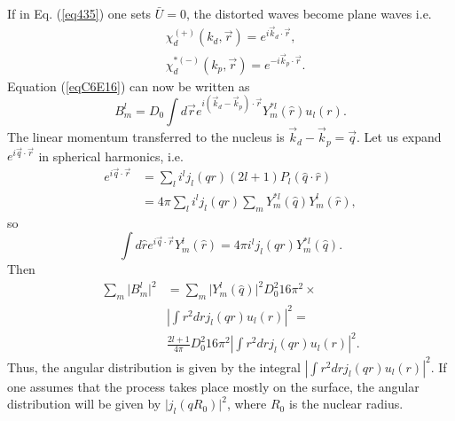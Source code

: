 \begin{subappendices}
If in Eq. (\ref{eq435}) one sets $\bar U=0$, the distorted waves become plane waves i.e.
 \begin{subequations}
\begin{align}\label{eq437}
&\chi^{(+)}_d(k_d,\vec r)=e^{i \vec k_d \cdot \vec r},\\
&\chi^{*(-)}_d(k_p,\vec r)=e^{-i \vec k_p \cdot \vec r}.
\end{align}
\end{subequations}
Equation (\ref{eqC6E16}) can now be written as
\begin{equation}\label{eq438}
B_{m}^l=D_0 \int d\vec r e^{i (\vec k_d-\vec k_p) \cdot \vec r} Y_m^{*l}(\hat r) u_{l}(r).
\end{equation}
The linear momentum transferred to the nucleus is $\vec k_d-\vec k_p=\vec q$.
Let us expand $e^{i \vec q \cdot \vec r}$ in spherical harmonics, i.e.
\begin{equation}\label{eq439}
\begin{split}
 e^{i \vec q \cdot \vec r}&=\sum_l i^l j_l(qr)(2l+1)P_l(\hat q \cdot \hat r)\\
& =4 \pi \sum_l i^l j_l(qr)\sum_m Y_m^{*l}(\hat q) Y_m^{l}(\hat r),
\end{split}
\end{equation}
so
\begin{equation}\label{eq440}
 \int d\hat r e^{i \vec q \cdot \vec r} Y_m^{l}(\hat r)= 4 \pi i^l j_l(qr) Y_m^{*l}(\hat q).
\end{equation}
Then
\begin{equation}\label{eq441}
\begin{split}
 \sum_{m} \vert B_{m}^l\vert^2 & = \sum_{m} \vert Y_m^{l}(\hat q)\vert^2 D_0^2 16 \pi^2 \times \\
& \left \vert \int r^2 dr j_l(qr) u_l(r) \right \vert ^2=\\
& \frac{2l+1}{4 \pi} D_0^2 16 \pi^2 \left \vert \int r^2 dr j_l(qr) u_l(r) \right \vert ^2.
\end{split}
\end{equation}
Thus, the angular distribution is given by the integral $\left \vert \int r^2 dr j_l(qr) u_l(r) \right \vert ^2$. If one assumes that the process takes place mostly on the surface, the angular distribution will be given by $ \vert j_l(qR_0) \vert ^2$, where $R_0$ is the nuclear radius.


\end{subappendices}
